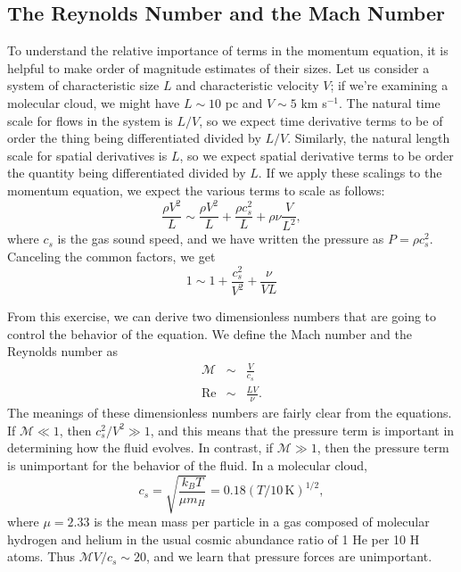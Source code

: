 \subsection{The Reynolds Number and the Mach Number}

To understand the relative importance of terms in the momentum equation, it is helpful to make order of magnitude estimates of their sizes. Let us consider a system of characteristic size $L$ and characteristic velocity $V$; if we're examining a molecular cloud, we might have $L\sim 10$ pc and $V\sim 5$ km s$^{-1}$. The natural time scale for flows in the system is $L/V$, so we expect time derivative terms to be of order the thing being differentiated divided by $L/V$. Similarly, the natural length scale for spatial derivatives is $L$, so we expect spatial derivative terms to be order the quantity being differentiated divided by $L$. If we apply these scalings to the momentum equation, we expect the various terms to scale as follows:
\begin{equation}
\frac{\rho V^2}{L} \sim \frac{\rho V^2}{L} + \frac{\rho c_s^2}{L} + \rho \nu \frac{V}{L^2},
\end{equation}
where $c_s$ is the gas sound speed, and we have written the pressure as $P = \rho c_s^2$. Canceling the common factors, we get
\begin{equation}
1 \sim 1 + \frac{c_s^2}{V^2} + \frac{\nu}{VL}
\end{equation}

From this exercise, we can derive two dimensionless numbers that are going to control the behavior of the equation. We define the Mach number and the Reynolds number as
\begin{eqnarray}
\mathcal{M} & \sim & \frac{V}{c_s} \\
\mathrm{Re} & \sim & \frac{LV}{\nu}.
\end{eqnarray}
The meanings of these dimensionless numbers are fairly clear from the equations. If $\mathcal{M} \ll 1$, then $c_s^2/V^2 \gg 1$, and this means that the pressure term is important in determining how the fluid evolves. In contrast, if $\mathcal{M} \gg 1$, then the pressure term is unimportant for the behavior of the fluid. In a molecular cloud,
\begin{equation}
c_s  =\sqrt{\frac{k_B T}{\mu m_H}} = 0.18 (T/10\,\mathrm{K})^{1/2},
\end{equation}
where $\mu =2.33$ is the mean mass per particle in a gas composed of molecular hydrogen and helium in the usual cosmic abundance ratio of 1 He per 10 H atoms. Thus $\mathcal{M} V/c_s \sim 20$, and we learn that pressure forces are unimportant.

